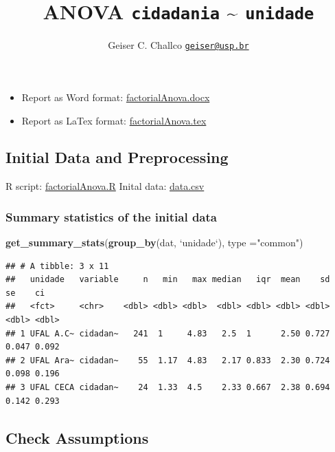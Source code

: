 \documentclass[]{article}
\title{ANOVA \texttt{cidadania} \textasciitilde{} \texttt{unidade}}
\author{Geiser C. Challco \href{mailto:geiser@usp.br}{\nolinkurl{geiser@usp.br}}}
\date{}
\newenvironment{Shaded}{\begin{snugshade}}{\end{snugshade}}
\newcommand{\DataTypeTok}[1]{\textcolor[rgb]{0.13,0.29,0.53}{#1}}
\newcommand{\KeywordTok}[1]{\textcolor[rgb]{0.13,0.29,0.53}{\textbf{#1}}}
\newcommand{\NormalTok}[1]{#1}
\newcommand{\StringTok}[1]{\textcolor[rgb]{0.31,0.60,0.02}{#1}}
\providecommand{\tightlist}{%
  \setlength{\itemsep}{0pt}\setlength{\parskip}{0pt}}
\begin{document}
\maketitle

\begin{itemize}
\tightlist
\item
  Report as Word format: \url{factorialAnova.docx}
\item
  Report as LaTex format: \url{factorialAnova.tex}
\end{itemize}

\hypertarget{initial-data-and-preprocessing}{%
\subsection{Initial Data and
Preprocessing}\label{initial-data-and-preprocessing}}

R script: \url{factorialAnova.R} Inital data: \url{data.csv}

\hypertarget{summary-statistics-of-the-initial-data}{%
\subsubsection{Summary statistics of the initial
data}\label{summary-statistics-of-the-initial-data}}

\begin{Shaded}
\begin{Highlighting}[]
\KeywordTok{get_summary_stats}\NormalTok{(}\KeywordTok{group_by}\NormalTok{(dat, }\StringTok{`}\DataTypeTok{unidade}\StringTok{`}\NormalTok{), }\DataTypeTok{type =}\StringTok{"common"}\NormalTok{)}
\end{Highlighting}
\end{Shaded}

\begin{verbatim}
## # A tibble: 3 x 11
##   unidade   variable     n   min   max median   iqr  mean    sd    se    ci
##   <fct>     <chr>    <dbl> <dbl> <dbl>  <dbl> <dbl> <dbl> <dbl> <dbl> <dbl>
## 1 UFAL A.C~ cidadan~   241  1     4.83   2.5  1      2.50 0.727 0.047 0.092
## 2 UFAL Ara~ cidadan~    55  1.17  4.83   2.17 0.833  2.30 0.724 0.098 0.196
## 3 UFAL CECA cidadan~    24  1.33  4.5    2.33 0.667  2.38 0.694 0.142 0.293
\end{verbatim}

\hypertarget{check-assumptions}{%
\subsection{Check Assumptions}\label{check-assumptions}}
\end{document}

